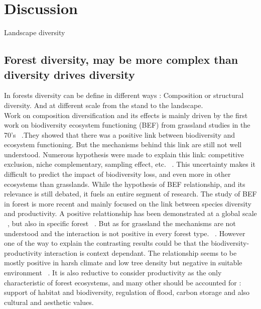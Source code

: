 \documentclass{article}
\begin{document}
\section{Discussion}

Landscape diversity

\subsection{Forest diversity, may be more complex than diversity drives diversity}

In forests diversity can be define in different ways : Composition or structural diversity. And at different scale from the stand to the landscape.\\
Work on composition diversification and its effects is mainly driven by the first work on biodiversity ecosystem functioning (BEF) from grassland studies in the 70's ~\autocite{tilmanBiodiversityPopulationEcosystem1996}.They showed that there was a positive link between biodiversity and ecosystem functioning. But the mechanisms behind this link are still not well understood. Numerous hypothesis were made to explain this link: competitive exclusion, niche complementary, sampling effect, etc. ~\autocite{aliBiodiversityEcosystemFunctioning2023}. This uncertainty makes it difficult to predict the impact of biodiversity loss, and even more in other ecosystems than grasslands.
While the hypothesis of BEF relationship, and its relevance is still debated, it fuels an entire segment of research.
The study of BEF in forest is more recent and mainly focused on the link between species diversity and productivity. A positive relattionship has been demonstrated at a global scale ~\autocite{liangPositiveBiodiversityproductivityRelationship2016}, but also in specific forest ~\autocite{morinTreeSpeciesRichness2011,paquetteEffectBiodiversityTree2011,jourdanManagingMixedStands2021}. But as for grassland the mechanisms are not understood and the interaction is not positive in every forest type. ~\autocite{forresterReviewProcessesDiversity2016}.
However one of the way to explain the contrasting results could be that the biodiversity-productivity interaction is context dependant. The relationship seems to be mostly positive in harsh climate and low tree density but negative in suitable environment ~\autocite{juckerClimateModulatesEffects2016}.
It is also reductive to consider productivity as the only characteristic of forest ecosystems, and many other should be accounted for : support of habitat and biodiversity, regulation of flood, carbon storage and also cultural and aesthetic values.
\end{document}
